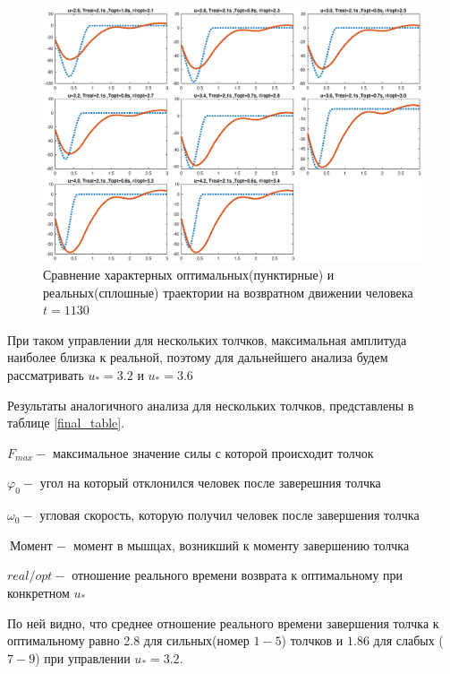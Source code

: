 \documentclass[a4paper,12pt, openany]{book}
\theoremstyle{plain} %
\theoremstyle{definition} %
\theoremstyle{remark} %
\numberwithin{equation}{chapter}
\begin{document}
{\begin{figure}[h!]
    \centering
    \includegraphics[width=1\linewidth]{final_graphs_1.eps}
    \caption{Сравнение характерных оптимальных(пунктирные) и реальных(сплошные) траектории на возвратном движении человека $t=1130$}
    \label{final_graphs_1}
\end{figure}

При таком управлении для нескольких толчков, максимальная амплитуда наиболее близка к реальной, поэтому для дальнейшего анализа будем рассматривать $u_*=3.2$ и $u_*=3.6$


Результаты аналогичного анализа для нескольких толчков,
представлены в таблице \ref{final_table}.

$F_{max} - $ максимальное значение силы с которой происходит толчок

$\varphi_0 - $ угол на который отклонился человек после заверешния толчка

$\omega_0 - $ угловая скорость, которую получил человек после завершения толчка

$\text{Момент } - $ момент в мышцах, возникший к моменту завершению толчка

$real/opt - $ отношение реального времени возврата к оптимальному при конкретном $u_\ast$

По ней видно, что среднее отношение реального времени завершения толчка к оптимальному равно 2.8 для сильных(номер $1-5$)
толчков и $1.86$ для слабых ($7-9$) при управлении $u_*=3.2$.


}
\end{document}
